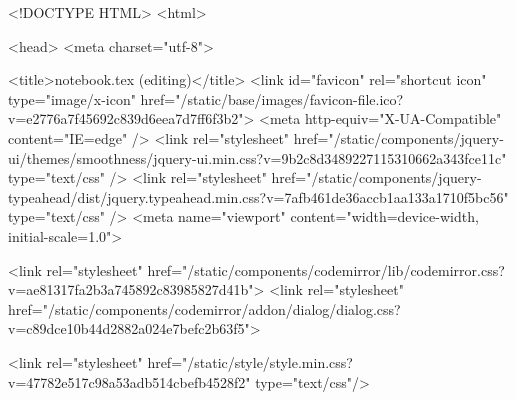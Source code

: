 <!DOCTYPE HTML>
<html>

<head>
    <meta charset="utf-8">

    <title>notebook.tex (editing)</title>
    <link id="favicon" rel="shortcut icon" type="image/x-icon" href="/static/base/images/favicon-file.ico?v=e2776a7f45692c839d6eea7d7ff6f3b2">
    <meta http-equiv="X-UA-Compatible" content="IE=edge" />
    <link rel="stylesheet" href="/static/components/jquery-ui/themes/smoothness/jquery-ui.min.css?v=9b2c8d3489227115310662a343fce11c" type="text/css" />
    <link rel="stylesheet" href="/static/components/jquery-typeahead/dist/jquery.typeahead.min.css?v=7afb461de36accb1aa133a1710f5bc56" type="text/css" />
    <meta name="viewport" content="width=device-width, initial-scale=1.0">
    
    
<link rel="stylesheet" href="/static/components/codemirror/lib/codemirror.css?v=ae81317fa2b3a745892c83985827d41b">
<link rel="stylesheet" href="/static/components/codemirror/addon/dialog/dialog.css?v=c89dce10b44d2882a024e7befc2b63f5">

    <link rel="stylesheet" href="/static/style/style.min.css?v=47782e517c98a53adb514cbefb4528f2" type="text/css"/>
    

